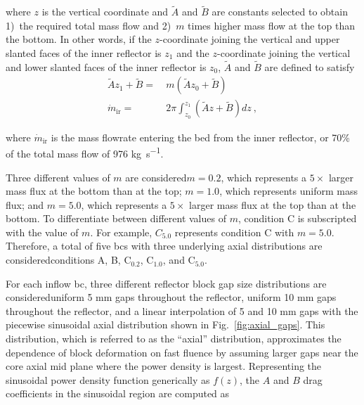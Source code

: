 \noindent where \(z\) is the vertical coordinate and \(\tilde{A}\) and \(\tilde{B}\) are constants selected to obtain 1)~the required total mass flow and 2)~\(m\) times higher mass flow at the top than the bottom. In other words, if the $z$-coordinate joining the vertical and upper slanted faces of the inner reflector is \(z_1\) and the $z$-coordinate joining the vertical and lower slanted faces of the inner reflector is \(z_0\), \(\tilde{A}\) and \(\tilde{B}\) are defined to satisfy
\begin{subequations}
\begin{align}
\label{eq:MFBC1}
\tilde{A}z_1+\tilde{B}=&\ m\left(\tilde{A}z_0+\tilde{B}\right)\\
\dot{m}_\text{ir}=&\ 2\pi\int_{z_0}^{z_1}\left(\tilde{A}z+\tilde{B}\right)dz\ ,
\end{align}
\end{subequations}

\noindent where \(\dot{m}_\text{ir}\) is the mass flowrate entering the bed from the inner reflector, or 70\% of the total mass flow of 976 \si{\kilo\gram\per\second}.

Three different values of \(m\) are considered\mdash \(m=0.2\), which represents a \(5\times\) larger mass flux at the bottom than at the top; \(m=1.0\), which represents uniform mass flux; and \(m=5.0\), which represents a \(5\times\) larger mass flux at the top than at the bottom. To differentiate between different values of \(m\), condition C is subscripted with the value of \(m\). For example, \(C_{5.0}\) represents condition C with \(m=5.0\). Therefore, a total of five \glspl{bc} with three underlying axial distributions are considered\mdash conditions A, B, C$_\text{0.2}$, C$_\text{1.0}$, and C$_\text{5.0}$.

For each inflow \gls{bc}, three different reflector block gap size distributions are considered\mdash uniform 5 \si{\milli\meter} gaps throughout the reflector, uniform 10 \si{\milli\meter} gaps throughout the reflector, and a linear interpolation of 5 and 10 \si{\milli\meter} gaps with the piecewise sinusoidal axial distribution shown in Fig.\ \ref{fig:axial_gaps}. This distribution, which is referred to as the ``axial'' distribution, approximates the dependence of block deformation on fast fluence by assuming larger gaps near the core axial mid plane where the power density is largest. Representing the sinusoidal power density function generically as \(f(z)\), the \(A\) and \(B\) drag coefficients in the sinusoidal region are computed as

